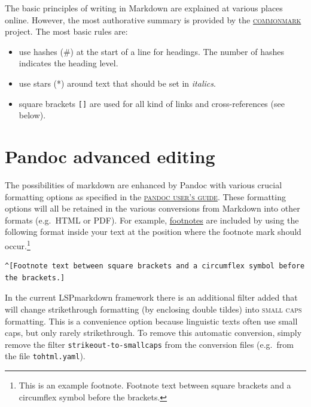 The\paragraphnumber{[2.1]} basic principles of writing in Markdown are
explained at various places online. However, the most authorative
summary is provided by the
\href{https://commonmark.org}{\textsc{commonmark}} project. The most
basic rules are:

\begin{itemize}
\tightlist
\item
  use hashes (\#) at the start of a line for headings. The number of
  hashes indicates the heading level.
\item
  use stars (*) around text that should be set in \emph{italics}.
\item
  square brackets \texttt{{[}{]}} are used for all kind of links and
  cross-references (see below).
\end{itemize}

\hypertarget{pandoc-advanced-editing}{%
\section{Pandoc advanced editing}\label{pandoc-advanced-editing}}

The\paragraphnumber{[2.2]} possibilities of markdown are enhanced by
Pandoc with various crucial formatting options as specified in the
\href{https://pandoc.org/MANUAL.html\#pandocs-markdown}{\textsc{pandoc
user's guide}}. These formatting options will all be retained in the
various conversions from Markdown into other formats (e.g.~HTML or PDF).
For example, \href{https://pandoc.org/MANUAL.html\#footnotes}{footnotes}
are included by using the following format inside your text at the
position where the footnote mark should occur.\footnote{This is an
  example footnote. Footnote text between square brackets and a
  circumflex symbol before the brackets.}

\begin{verbatim}
^[Footnote text between square brackets and a circumflex symbol before the brackets.]
\end{verbatim}

In\paragraphnumber{[2.3]} the current LSPmarkdown framework there is an
additional filter added that will change strikethrough formatting (by
enclosing double tildes) into \textsc{small caps} formatting. This is a
convenience option because linguistic texts often use small caps, but
only rarely strikethrough. To remove this automatic conversion, simply
remove the filter \texttt{strikeout-to-smallcaps} from the conversion
files (e.g.~from the file \texttt{tohtml.yaml}).

